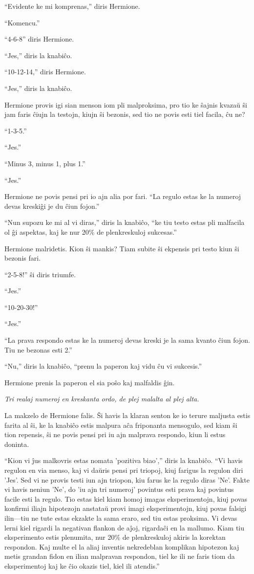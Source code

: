 ``Evidente ke mi komprenas,'' diris Hermione.

``Komencu.''

``4-6-8'' diris Hermione.

``Jes,'' diris la knabiĉo.

``10-12-14,'' diris Hermione.

``Jes,'' diris la knabiĉo.

Hermione provis igi sian menson iom pli malproksima, pro tio ke ŝajnis
kvazaŭ ŝi jam faris ĉiujn la testojn, kiujn ŝi bezonis, sed tio ne
povis esti tiel facila, ĉu ne?

``1-3-5.''

``Jes.''

``Minus 3, minus 1, plus 1.''

``Jes.''

Hermione ne povis pensi pri io ajn alia por fari. ``La regulo estas ke
la numeroj devas kreskiĝi je du ĉiun fojon.''

``Nun supozu ke mi al vi diras,'' diris la knabiĉo, ``ke tiu testo
estas pli malfacila ol ĝi aspektas, kaj ke nur 20\% de plenkreskuloj
sukcesas.''

Hermione malridetis. Kion ŝi mankis? Tiam subite ŝi ekpensis pri testo
kiun ŝi bezonis fari.

``2-5-8!'' ŝi diris triumfe.

``Jes.''

``10-20-30!''

``Jes.''

``La prava respondo estas ke la numeroj devas kreski je la sama kvanto
ĉiun fojon. Tiu ne bezonas esti 2.''

``Nu,'' diris la knabiĉo, ``prenu la paperon kaj vidu ĉu vi
sukcesis.''

Hermione prenis la paperon el sia poŝo kaj malfaldis ĝin.

\emph{Tri realaj numeroj en kreskanta ordo, de plej malalta al plej
  alta.}

La makzelo de Hermione falis. Ŝi havis la klaran senton ke io terure
maljusta estis farita al ŝi, ke la knabiĉo estis malpura aĉa friponanta
mensogulo, sed kiam ŝi tion repensis, ŝi ne povis pensi pri iu ajn malprava
respondo, kiun li estus doninta.

``Kion vi ĵus malkovris estas nomata 'pozitiva biao','' diris la
knabiĉo. ``Vi havis regulon en via menso, kaj vi daŭris pensi pri
triopoj, kiuj farigus la regulon diri 'Jes'. Sed vi ne provis testi
iun ajn triopon, kiu farus ke la regulo diras 'Ne'. Fakte vi havis
neniun 'Ne', do 'iu ajn tri numeroj' povintus esti prava kaj povintus
facile esti la regulo. Tio estas kiel kiam homoj imagas
eksperimentojn, kiuj povas konfirmi iliajn hipotezojn anstataŭ provi
imagi eksperimentojn, kiuj povas falsigi ilin—tiu ne tute estas
ekzakte la sama eraro, sed tiu estas proksima. Vi devas lerni kiel
rigardi la negativan flankon de aĵoj, rigardaĉi en la mallumo. Kiam
tiu eksperimento estis plenumita, nur 20\% de plenkreskuloj akiris la
korektan respondon. Kaj multe el la aliaj inventis nekredeblan
komplikan hipotezon kaj metis grandan fidon en ilian malpravan
respondon, tiel ke ili ne faris tiom da eksperimentoj kaj ke ĉio okazis
tiel, kiel ili atendis.''

